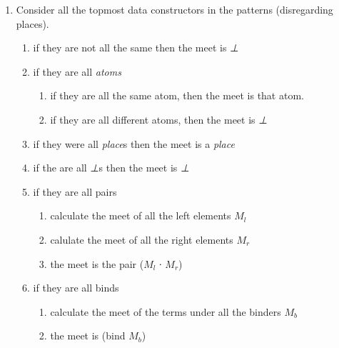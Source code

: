 \begin{appendices}
\begin{enumerate}
\item Consider all the topmost data constructors in the patterns
  (disregarding places).
  \begin{enumerate}
  \item if they are not all the same then the meet is \emph{⊥}
  \item if they are all \emph{atoms}
    \begin{enumerate}
    \item if they are all the same atom, then the meet is that atom.
      \item if they are all different atoms, then the meet is \emph{⊥}
    \end{enumerate}
  \item if they were all \emph{place}s then the meet is a \emph{place}
  \item if the are all \emph{⊥}s then the meet is \emph{⊥}  
  \item if they are all pairs
    \begin{enumerate}
      \item calculate the meet of all the left elements $M_l$
      \item calulate the meet of all the right elements $M_r$
      \item the meet is the pair ($M_l$ ∙ $M_r$)
    \end{enumerate}
  \item if they are all binds
    \begin{enumerate}
    \item calculate the meet of the terms under all the binders $M_b$
    \item the meet is (bind $M_b$)
    \end{enumerate}
  \end{enumerate}
\end{enumerate}

\end{appendices}

